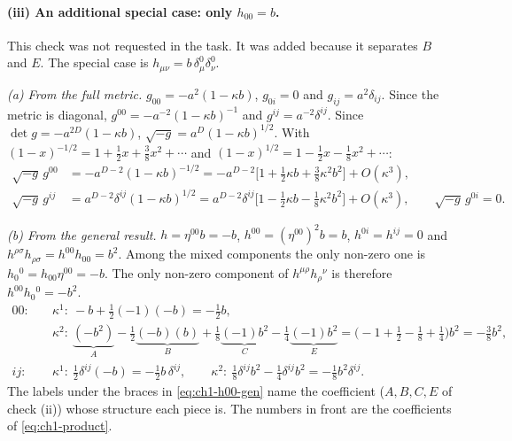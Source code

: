 \paragraph{(iii) An additional special case: only $h_{00}=b$.} This check was
not requested in the task. It was added because it separates $B$ and $E$. The
special case is $h_{\mu\nu}=b\,\delta^0_\mu\delta^0_\nu$.

\emph{(a) From the full metric.} $g_{00}=-a^2(1-\kappa b)$, $g_{0i}=0$ and
$g_{ij}=a^2\delta_{ij}$. Since the metric is diagonal,
$g^{00}=-a^{-2}(1-\kappa b)^{-1}$ and $g^{ij}=a^{-2}\delta^{ij}$. Since
$\det g=-a^{2D}(1-\kappa b)$, $\sqrt{-g}=a^D(1-\kappa b)^{1/2}$. With
$(1-x)^{-1/2}=1+\tfrac12x+\tfrac38x^2+\cdots$ and
$(1-x)^{1/2}=1-\tfrac12x-\tfrac18x^2+\cdots$:
\begin{equation}
\begin{aligned}\sqrt{-g}\,g^{00}&=-a^{D-2}(1-\kappa b)^{-1/2}=-a^{D-2}\big[1+\tfrac12\kappa b+\tfrac38\kappa^2b^2\big]+O(\kappa^3),\\
\sqrt{-g}\,g^{ij}&=a^{D-2}\delta^{ij}(1-\kappa b)^{1/2}=a^{D-2}\delta^{ij}\big[1-\tfrac12\kappa b-\tfrac18\kappa^2b^2\big]+O(\kappa^3),\qquad \sqrt{-g}\,g^{0i}=0.\end{aligned}
\label{eq:ch1-h00-exact}
\end{equation}

\emph{(b) From the general result.} $h=\eta^{00}b=-b$, $h^{00}=(\eta^{00})^2b=b$,
$h^{0i}=h^{ij}=0$ and $h^{\rho\sigma}h_{\rho\sigma}=h^{00}h_{00}=b^2$. Among the
mixed components the only non-zero one is $h_0{}^0=h_{00}\eta^{00}=-b$. The only
non-zero component of $h^{\mu\rho}h_\rho{}^\nu$ is therefore
$h^{00}h_0{}^0=-b^2$.
\begin{equation}
\begin{aligned}
00:\quad&\kappa^1:\ -b+\tfrac12(-1)(-b)=-\tfrac12b,\\
&\kappa^2:\ \underbrace{(-b^2)}_{A}-\tfrac12\underbrace{(-b)(b)}_{B}+\tfrac18\underbrace{(-1)b^2}_{C}-\tfrac14\underbrace{(-1)b^2}_{E}=\big(-1+\tfrac12-\tfrac18+\tfrac14\big)b^2=-\tfrac38b^2,\\
ij:\quad&\kappa^1:\ \tfrac12\delta^{ij}(-b)=-\tfrac12b\,\delta^{ij},\qquad
\kappa^2:\ \tfrac18\delta^{ij}b^2-\tfrac14\delta^{ij}b^2=-\tfrac18b^2\delta^{ij}.
\end{aligned}
\label{eq:ch1-h00-gen}
\end{equation}
The labels under the braces in \eqref{eq:ch1-h00-gen} name the coefficient
($A,B,C,E$ of check (ii)) whose structure each piece is. The numbers in front
are the coefficients of \eqref{eq:ch1-product}.

